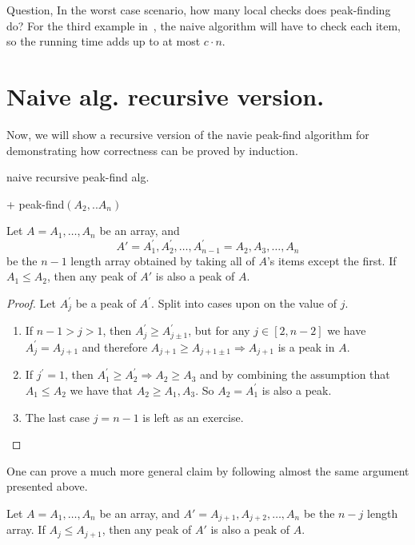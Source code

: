 Question, In the worst case scenario, how many local checks does peak-finding do? For the third example in~, the naive algorithm will have to check each item, so the running time adds up to at most $c \cdot n$.

\section{Naive alg. recursive version.}
Now, we will show a recursive version of the navie peak-find algorithm for demonstrating how correctness can be proved by induction. 
\begin{algorithm}[h]
\caption{naive recursive peak-find alg.}
  + peak-find$(A_{2}, .. A_{n})$
 \end{algorithm}

 \begin{claim} \label{claim:subarray} 
   Let $A = A_1, \dots, A_n$ be an array, and $$A' = A^{\prime}_1, A^{\prime}_2, \dots, A^{\prime}_{n-1} =  A_2, A_3, \dots, A_n$$ be the $n-1$ length array obtained by taking all of $A$'s items except the first. If $A_1 \le A_2$, then any peak of $A'$ is also a peak of $A$.
\end{claim}
\begin{proof} 
Let $A^{\prime}_{j}$ be a peak of $A^{\prime}$. Split into cases upon on the value of $j$.

\begin{enumerate}
  \item If $n-1 > j > 1$, then $A^{\prime}_{j} \ge A^{\prime}_{j \pm 1}$, but for any $j \in [2, n-2]$ we have $A^{\prime}_{j} = A_{j+1}$ and therefore $A_{j+1} \ge A_{j+1 \pm 1} \Rightarrow A_{j+1}$ is a peak in $A$.
  \item If $j^{\prime} = 1$, then $A^{\prime}_{1} \ge A^{\prime}_{2} \Rightarrow A_{2} \ge A_{3}$ and by combining the assumption that $A_{1} \le A_{2}$ we have that $A_{2} \ge A_{1}, A_{3}$. So $A_{2} = A^{\prime}_{1}$ is also a peak.
  \item The last case $j = n-1$ is left as an exercise.
\end{enumerate}
\end{proof}

One can prove a much more general claim by following almost the same argument presented above.

 \begin{claim} \label{claim:subarraymiddle} 
   Let $A = A_1, \dots, A_n$ be an array, and $A' = A_{j+1}, A_{j+2}, \dots, A_n$ be the $n-j$ length array. If $A_j \le A_{j+1}$, then any peak of $A'$ is also a peak of $A$.
\end{claim}

